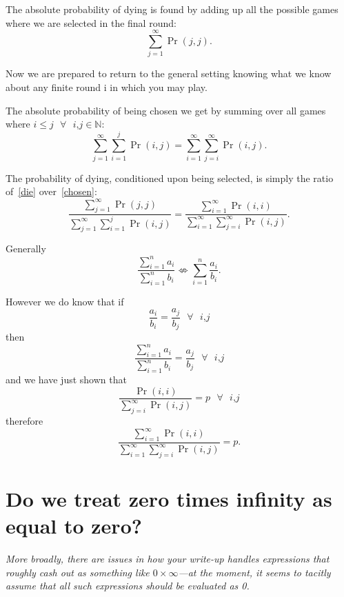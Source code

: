 \documentclass[article,twocolumn]{memoir}
\begin{document}
The absolute probability of dying is found by adding up all the possible games where we are selected in the final round:
\begin{equation}\label{die}
\sum_{j=1}^{\infty} \Pr(j,j). 
\end{equation} 

Now we are prepared to return to the general setting knowing what we know about any finite round i in which you may play.
        
The absolute probability of being chosen we get by summing over all games where 
$i\leq j \text{ }\forall \text{ } i\text{,}j \in \mathbb{N}$:
\begin{equation}\label{chosen}
\sum_{j=1}^{\infty} \sum_{i=1}^{j} \Pr(i,j) = \sum_{i=1}^{\infty} \sum_{j=i}^{\infty} \Pr(i,j).
\end{equation}
        
The probability of dying, conditioned upon being selected, is simply the ratio of~\eqref{die} over~\eqref{chosen}:
\begin{equation}
\frac{\sum_{j=1}^{\infty} \Pr(j,j)}{\sum_{j=1}^{\infty} \sum_{i=1}^{j} \Pr(i,j)} = \frac{\sum_{i=1}^{\infty} \Pr(i,i)}{\sum_{i=1}^{\infty} \sum_{j=i}^{\infty} \Pr(i,j)}\label{theAnswer}.
\end{equation}

Generally 
$$\frac{\sum_{i=1}^{n} a_i}{\sum_{i=1}^{n} b_i}\nLeftrightarrow \sum_{i=1}^{n} \frac{a_i}{b_i}.$$

However we do know that if 
$$\frac{a_i}{b_i}=\frac{a_j}{b_j} \text{   } \forall \text{ } i\text{,}j$$
then
$$\frac{\sum_{i=1}^{n} a_i}{\sum_{i=1}^{n} b_i} = \frac{a_j}{b_j}\text{   } \forall \text{ } i\text{,}j$$
and we have just shown that 
$$\frac{\Pr(i,i)}{\sum_{j=i}^\infty \Pr(i,j)} = p \text{   } \forall \text{ } i\text{,}j$$
therefore 
$$\frac{\sum_{i=1}^{\infty} \Pr(i,i)}{\sum_{i=1}^{\infty} \sum_{j=i}^{\infty} \Pr(i,j)}=p.$$


\chapter{Do we treat zero times infinity as equal to zero?}

\emph{More broadly, there are issues in how your write-up handles expressions that roughly cash out as something like $0\times\infty$---at the moment, it seems to tacitly assume that all such expressions should be evaluated as 0.}

\vspace{1em}
\end{document}
